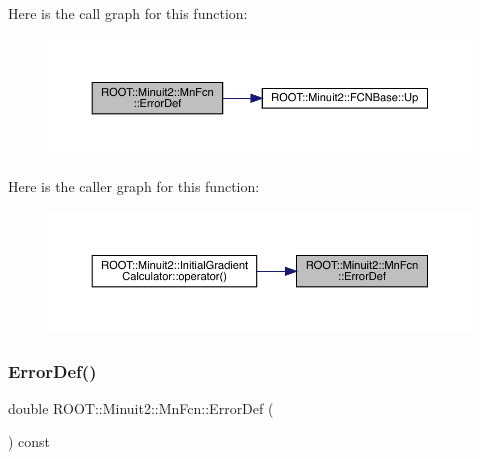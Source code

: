 Here is the call graph for this function\+:\nopagebreak
\begin{figure}[H]
\begin{center}
\leavevmode
\includegraphics[width=350pt]{de/d0e/classROOT_1_1Minuit2_1_1MnFcn_abca32e4dd5ef187be7e099df14b4b54a_cgraph}
\end{center}
\end{figure}
Here is the caller graph for this function\+:\nopagebreak
\begin{figure}[H]
\begin{center}
\leavevmode
\includegraphics[width=350pt]{de/d0e/classROOT_1_1Minuit2_1_1MnFcn_abca32e4dd5ef187be7e099df14b4b54a_icgraph}
\end{center}
\end{figure}
\mbox{\label{classROOT_1_1Minuit2_1_1MnFcn_abca32e4dd5ef187be7e099df14b4b54a}} 
\subsubsection{\texorpdfstring{ErrorDef()}{ErrorDef()}\hspace{0.1cm}{\footnotesize\ttfamily [2/2]}}
{\footnotesize\ttfamily double R\+O\+O\+T\+::\+Minuit2\+::\+Mn\+Fcn\+::\+Error\+Def (\begin{DoxyParamCaption}{ }\end{DoxyParamCaption}) const}

\mbox{\label{classROOT_1_1Minuit2_1_1MnFcn_a667fd993a6bb4832e6e70b7eaaca9fa4}} 
